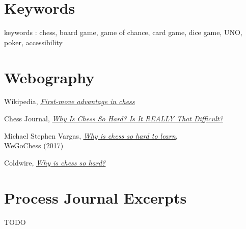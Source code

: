 \documentclass[12pt]{article}
\begin{document}
    \section{Keywords}
        keywords : chess, board game, game of chance, card game, dice game, UNO, poker, accessibility
    
    \section{Webography}
        \begin{thebibliography}{9}
                Wikipedia, \textit{\href{https://en.wikipedia.org/wiki/First-move_advantage_in_chess}{\underline{First-move advantage in chess}} }
                
                Chess Journal, \textit{\href{https://www.chessjournal.com/why-is-chess-so-hard/}{\underline{Why Is Chess So Hard? Is It REALLY That Difficult?}} }
            
                Michael Stephen Vargas, \href{
        https://wegochess.com/why-is-chess-so-hard-to-learn/}{\underline{\textit{Why is chess so hard to learn}}},
                \\WeGoChess (2017)
            
                Coldwire,
                \href{https://www.thecoldwire.com/why-is-chess-so-hard/}{\underline{\textit{Why is chess so hard?}}}
        \end{thebibliography}
    \section{Process Journal Excerpts}
        TODO
    
\end{document}

